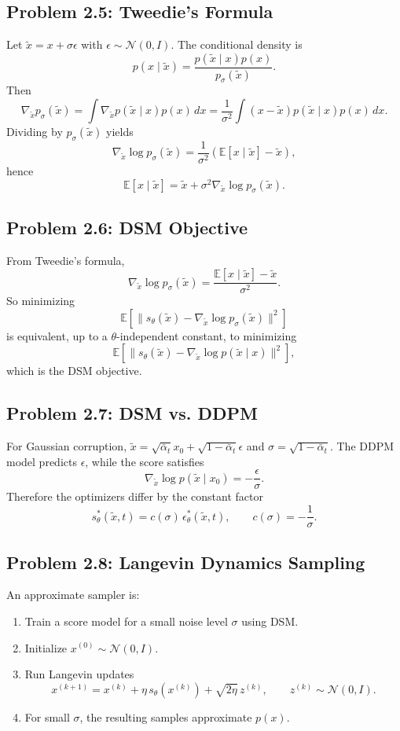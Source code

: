 \documentclass[11pt]{article}
\begin{document}
\subsection*{Problem 2.5: Tweedie's Formula}
Let $\tilde x=x+\sigma \epsilon$ with $\epsilon\sim\mathcal N(0,I)$. The conditional density is
\[
p(x\mid \tilde x)=\frac{p(\tilde x\mid x)p(x)}{p_\sigma(\tilde x)}.
\]
Then
\[
\nabla_{\tilde x}p_\sigma(\tilde x)=\int \nabla_{\tilde x}p(\tilde x\mid x)p(x)\,dx
= \frac{1}{\sigma^2}\int (x-\tilde x)p(\tilde x\mid x)p(x)\,dx.
\]
Dividing by $p_\sigma(\tilde x)$ yields
\[
\nabla_{\tilde x}\log p_\sigma(\tilde x)=\frac{1}{\sigma^2}\left(\mathbb E[x\mid \tilde x]-\tilde x\right),
\]
hence
\[
\mathbb E[x\mid \tilde x]=\tilde x+\sigma^2\nabla_{\tilde x}\log p_\sigma(\tilde x).
\]

\subsection*{Problem 2.6: DSM Objective}
From Tweedie's formula,
\[
\nabla_{\tilde x}\log p_\sigma(\tilde x)=\frac{\mathbb E[x\mid \tilde x]-\tilde x}{\sigma^2}.
\]
So minimizing
\[
\mathbb E\left[\|s_\theta(\tilde x)-\nabla_{\tilde x}\log p_\sigma(\tilde x)\|^2\right]
\]
is equivalent, up to a $\theta$-independent constant, to minimizing
\[
\mathbb E\left[\|s_\theta(\tilde x)-\nabla_{\tilde x}\log p(\tilde x\mid x)\|^2\right],
\]
which is the DSM objective.

\subsection*{Problem 2.7: DSM vs. DDPM}
For Gaussian corruption, $\tilde x = \sqrt{\bar\alpha_t}x_0 + \sqrt{1-\bar\alpha_t}\epsilon$ and $\sigma=\sqrt{1-\bar\alpha_t}$. The DDPM model predicts $\epsilon$, while the score satisfies
\[
\nabla_{\tilde x}\log p(\tilde x\mid x_0) = -\frac{\epsilon}{\sigma}.
\]
Therefore the optimizers differ by the constant factor
\[
s_\theta^*(\tilde x,t)=c(\sigma)\,\epsilon_\theta^*(\tilde x,t),\qquad c(\sigma)=-\frac{1}{\sigma}.
\]

\subsection*{Problem 2.8: Langevin Dynamics Sampling}
An approximate sampler is:
\begin{enumerate}[leftmargin=1.25em]
    \item Train a score model for a small noise level $\sigma$ using DSM.
    \item Initialize $x^{(0)}\sim \mathcal N(0,I)$.
    \item Run Langevin updates
    \[
    x^{(k+1)}=x^{(k)}+\eta\,s_\theta(x^{(k)})+\sqrt{2\eta}\,z^{(k)},\qquad z^{(k)}\sim\mathcal N(0,I).
    \]
    \item For small $\sigma$, the resulting samples approximate $p(x)$.
\end{enumerate}
\end{document}
